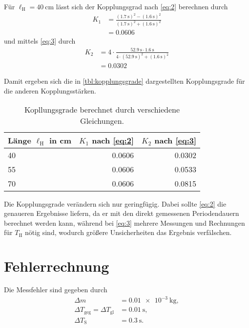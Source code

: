 \documentclass[
12pt,
a4paper,
bibliography=totocnumbered, %
BCOR=1cm, %
oneside, %
]{scrartcl}
\newcommand{\lh}{\ell_{\mathrm{H}}}
\begin{document}
Für \(\lh = \qty{40}{\centi \meter}\) lässt sich der Kopplungsgrad nach \autoref{eq:2} berechnen durch
\begin{align*}
	K_1 &= \frac{(\qty{1,7}{\second})^2 - (\qty{1,6}{\second})^2}{(\qty{1,7}{\second})^2 + (\qty{1,6}{\second})^2}\\
	&= \num{0,0606}
\end{align*}
und mittels \autoref{eq:3} durch
\begin{align*}
	K_2 &= 4 \cdot \frac{\qty{52,9}{\second} \cdot \qty{1,6}{\second}}{4 \cdot (\qty{52,9}{\second})^2 + (\qty{1,6}{\second})^2}\\
	&= \num{0,0302}
\end{align*}

Damit ergeben sich die in \autoref{tbl:kopplungsgrade} dargestellten Kopplungsgrade für die anderen Kopplungsstärken.

\begin{table}[H]
		\caption{Kopllungsgrade berechnet durch verschiedene Gleichungen. \label{tbl:kopplungsgrade}}
	\begin{tabular*}{\textwidth}{@{\extracolsep{\fill}}@{\hspace{5pt}}lrr@{\hspace{5pt}}}
		\toprule
		Länge \(\lh\) in \si{\centi\meter} & \(K_1\) nach \autoref{eq:2} & \(K_2\) nach \autoref{eq:3}\\
		\midrule
		\num{40} & \num{0,0606} & \num{0,0302}\\
		\num{55} & \num{0,0606} & \num{0,0533}\\
		\num{70} & \num{0,0606} & \num{0,0815}\\
		\bottomrule
	\end{tabular*}
\end{table}
Die Kopplungsgrade verändern sich nur geringfügig. Dabei sollte \autoref{eq:2} die genaueren Ergebnisse liefern, da er mit den direkt gemessenen Periodendauern berechnet werden kann, während bei \autoref{eq:3} mehrere Messungen und Rechnungen für \(T_{\text{II}}\) nötig sind, wodurch größere Unsicherheiten das Ergebnis verfälschen.

\section{Fehlerrechnung}

Die Messfehler sind gegeben durch
\begin{align*}
	\Delta m &= \qty{0,01e-3}{\kilogram},\\
	\Delta T_{\text{geg}} = \Delta T_{\text{gl}} &= \qty{0,01}{\second},\\
	\Delta T_{\text{S}} &= \qty{0,3}{\second}.
\end{align*}
\end{document}
